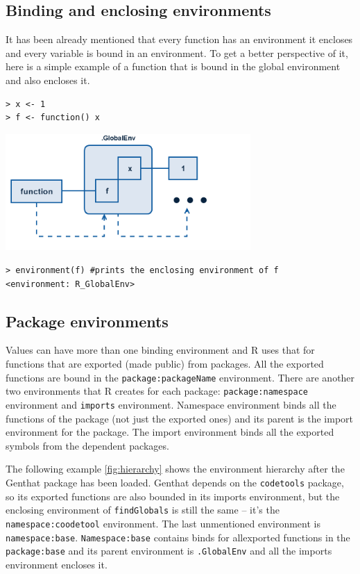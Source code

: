 \documentclass[thesis=B,english]{FITthesis}[2012/10/20]
\begin{document}
\subsection{Binding and enclosing environments}
It has been already mentioned that every function has an environment it encloses and every variable is bound in an environment. To get a better perspective of it, here is a simple example of a function that is bound in the global environment and also encloses it.

\begin{verbatim}
> x <- 1
> f <- function() x
\end{verbatim}

\includegraphics[width=0.7\textwidth]{img/enclosing-binding.png}

\begin{verbatim}
> environment(f) #prints the enclosing environment of f
<environment: R_GlobalEnv>
\end{verbatim}

\subsection{Package environments}

Values can have more than one binding environment and R uses that for functions that are exported (made public) from packages. All the exported functions are bound in the \verb|package:packageName| environment. There are another two environments that R creates for each package:  \verb|package:namespace| environment and \verb|imports| environment. Namespace environment binds all the functions of the package (not just the exported ones) and its parent is the import environment for the package. The import environment binds all the exported symbols from the dependent packages.

The following example \ref{fig:hierarchy} shows the environment hierarchy after the Genthat package has been loaded. Genthat depends on the \texttt{codetools} package\cite{codetools}, so its exported functions are also bounded in its imports environment, but the enclosing environment of \texttt{findGlobals} is still the same – it’s the \texttt{namespace:coodetool} environment. The last unmentioned environment is \texttt{namespace:base}. \texttt{Namespace:base} contains binds for allexported functions in the \texttt{package:base} and its parent environment is \texttt{.GlobalEnv} and all the imports environment encloses it.
\end{document}
